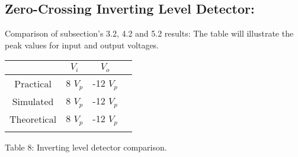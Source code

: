 \subsection{Zero-Crossing Inverting Level Detector:}

Comparison of subsection's 3.2, 4.2 and 5.2 results: The table will illustrate the peak values for input and output voltages. \hfill \break

\begin{center}
\begin{tabular}[.5cm]{c c c c}
\toprule
\toprule
& \hspace{60pt} $V_{i}$ \hspace{60pt} &  \hspace{60pt} \hspace{60pt} $V_{o}$ \hspace{60pt} \hspace{60pt}  \\
\midrule
\midrule
Practical & 8 $V_{p}$ & -12 $V_{p}$ \\
\cmidrule{1-3}
Simulated & 8 $V_{p}$ & -12 $V_{p}$ \\
\cmidrule{1-3}
Theoretical & 8 $V_{p}$ & -12 $V_{p}$ \\
\bottomrule
\linebreak
\end{tabular}
\linebreak Table 8: Inverting level detector comparison.
\end{center}
